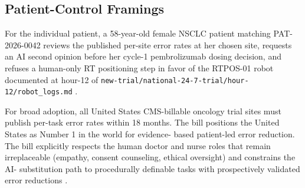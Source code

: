 \subsection{Patient-Control Framings}

For the individual patient, a 58-year-old female NSCLC patient
matching PAT-2026-0042 reviews the published per-site error rates
at her chosen site, requests an AI second opinion before her cycle-1
pembrolizumab dosing decision, and refuses a human-only RT
positioning step in favor of the RTPOS-01 robot documented at hour-12
of \texttt{new-trial/national-24-7-trial/hour-12/robot\_logs.md}
\cite{kawchak_2026_19994945, kawchak_2026_19119939}.

For broad adoption, all United States CMS-billable oncology trial
sites must publish per-task error rates within 18 months. The bill
positions the United States as Number 1 in the world for evidence-
based patient-led error reduction. The bill explicitly respects the
human doctor and nurse roles that remain irreplaceable (empathy,
consent counseling, ethical oversight) and constrains the AI-
substitution path to procedurally definable tasks with prospectively
validated error reductions \cite{kawchak_2026_19994945,
kawchak_2026_19119939}.
